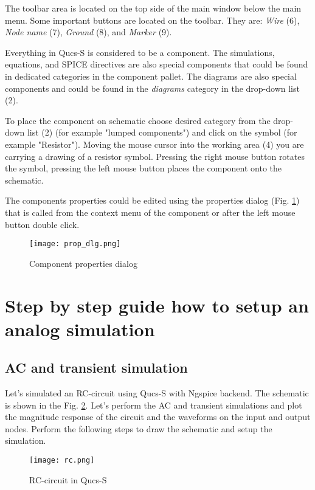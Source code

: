 The toolbar area is located on the top side of the main window below the main menu. Some important buttons are located on the toolbar. They are: \emph{Wire} (6), \emph{Node name} (7), \emph{Ground} (8), and \emph{Marker} (9).

Everything in Qucs-S is considered to be a component. The simulations, equations, and SPICE directives are also special components that could be found in dedicated categories in the component pallet. The diagrams are also special components and could be found in the \emph{diagrams} category in the drop-down list (2).

To place the component on schematic choose desired category from the drop-down list (2) (for example "lumped components") and click on the symbol (for example "Resistor"). Moving the mouse cursor into the working area (4) you are carrying a drawing of a resistor symbol. Pressing the right mouse button rotates the symbol, pressing the left mouse button places the component onto the schematic.

The components properties could be edited using the properties dialog (Fig. \ref{fig:prop_dlg}) that is called from the context menu of the component or after the left mouse button double click.

\begin{figure}[!ht]
  \begin{center}
    \texttt{[image: prop\_dlg.png]}
  \end{center}
  \caption{Component properties dialog} \label{fig:prop_dlg}
\end{figure}

\section{Step by step guide how to setup an analog simulation}

\subsection{AC and transient simulation}

Let's simulated an RC-circuit using Qucs-S with Ngspice backend. The schematic is shown in the Fig. \ref{fig:rc}. Let's perform the AC and transient simulations and plot the magnitude response of the circuit and the waveforms on the input and output nodes. Perform the following steps to draw the schematic and setup the simulation.

\begin{figure}[!ht]
  \begin{center}
    \texttt{[image: rc.png]}
  \end{center}
  \caption{RC-circuit in Qucs-S} \label{fig:rc}
\end{figure}


